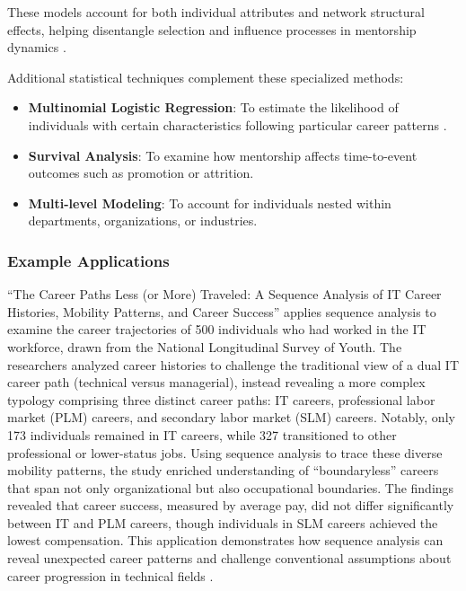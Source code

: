 \documentclass[main.tex]{subfiles}
\begin{document}
These models account for both individual attributes and network structural effects, helping disentangle selection and influence processes in mentorship dynamics \cite{oxford2012siena}.

Additional statistical techniques complement these specialized methods:
\begin{itemize}
\item \textbf{Multinomial Logistic Regression}: To estimate the likelihood of individuals with certain characteristics following particular career patterns \cite{pmc2015mapping}.
\item \textbf{Survival Analysis}: To examine how mentorship affects time-to-event outcomes such as promotion or attrition.
\item \textbf{Multi-level Modeling}: To account for individuals nested within departments, organizations, or industries.
\end{itemize}

\subsubsection{Example Applications}

``The Career Paths Less (or More) Traveled: A Sequence Analysis of IT Career Histories, Mobility Patterns, and Career Success'' applies sequence analysis to examine the career trajectories of 500 individuals who had worked in the IT workforce, drawn from the National Longitudinal Survey of Youth. The researchers analyzed career histories to challenge the traditional view of a dual IT career path (technical versus managerial), instead revealing a more complex typology comprising three distinct career paths: IT careers, professional labor market (PLM) careers, and secondary labor market (SLM) careers. Notably, only 173 individuals remained in IT careers, while 327 transitioned to other professional or lower-status jobs. Using sequence analysis to trace these diverse mobility patterns, the study enriched understanding of ``boundaryless'' careers that span not only organizational but also occupational boundaries. The findings revealed that career success, measured by average pay, did not differ significantly between IT and PLM careers, though individuals in SLM careers achieved the lowest compensation. This application demonstrates how sequence analysis can reveal unexpected career patterns and challenge conventional assumptions about career progression in technical fields \cite{misq2008career}.
\end{document}
